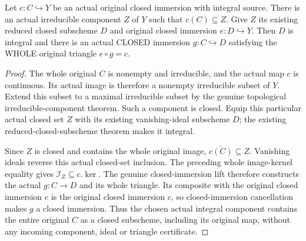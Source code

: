 \begin{theorem}
\label{thm:pl-gauss-integral-component-through-original-closed-subscheme}
\leanok
Let $c:C\hookrightarrow Y$ be an actual original closed immersion with
integral source. There is an actual irreducible component $Z$ of $Y$
such that $c(C)\subseteq Z$. Give $Z$ its existing reduced closed
subscheme $D$ and original closed immersion $e:D\hookrightarrow Y$.
Then $D$ is integral and there is an actual CLOSED immersion
$g:C\hookrightarrow D$ satisfying the WHOLE original triangle
$e\circ g=c$.
\end{theorem}
\begin{proof}
The whole original $C$ is nonempty and irreducible, and the actual map
$c$ is continuous. Its actual image is therefore a nonempty
irreducible subset of $Y$. Extend this subset to a maximal irreducible
subset by the genuine topological irreducible-component theorem.
Such a component is closed. Equip this particular actual closed set
$Z$ with its existing vanishing-ideal subscheme $D$; the existing
reduced-closed-subscheme theorem makes it integral.

Since $Z$ is closed and contains the whole original image,
$\overline{c(C)}\subseteq Z$. Vanishing ideals reverse this actual
closed-set inclusion. The preceding whole image-kernel equality gives
$\mathcal I_Z\subseteq c.\ker$. The genuine closed-immersion lift
therefore constructs the actual $g:C\to D$ and its whole triangle.
Its composite with the original closed immersion $e$ is the original
closed immersion $c$, so closed-immersion cancellation makes $g$ a
closed immersion. Thus the chosen actual integral component contains
the entire original $C$ as a closed subscheme, including its original
map, without any incoming component, ideal or triangle certificate.
\end{proof}

